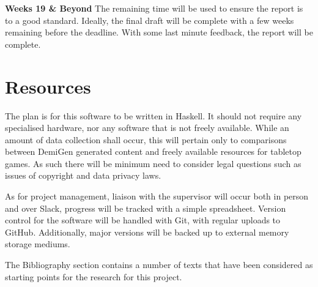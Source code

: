 \documentclass{article}
\begin{document}
\large
\textbf{Weeks 19 \& Beyond}
The remaining time will be used to ensure the report is to a good standard. Ideally, the final draft will be complete with a few weeks remaining before the deadline. With some last minute feedback, the report will be complete.

\section{Resources}
The plan is for this software to be written in Haskell. It should not require any specialised hardware, nor any software that is not freely available. While an amount of data collection shall occur, this will pertain only to comparisons between DemiGen generated content and freely available resources for tabletop games. As such there will be minimum need to consider legal questions such as issues of copyright and data privacy laws.

As for project management, liaison with the supervisor will occur both in person and over Slack, progress will be tracked with a simple spreadsheet.
Version control for the software will be handled with Git, with regular uploads to GitHub. Additionally, major versions will be backed up to external memory storage mediums. 

The Bibliography section contains a number of texts that have been considered as starting points for the research for this project.

\pagebreak


\end{document}
